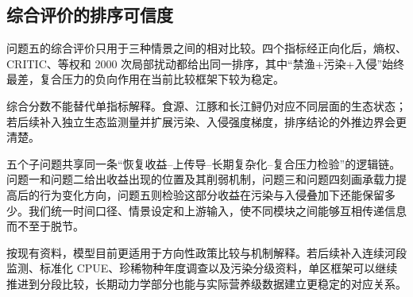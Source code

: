 \subsection{综合评价的排序可信度}
问题五的综合评价只用于三种情景之间的相对比较。四个指标经正向化后，熵权、CRITIC、等权和 2000 次局部扰动都给出同一排序，其中“禁渔+污染+入侵”始终最差，复合压力的负向作用在当前比较框架下较为稳定。

综合分数不能替代单指标解释。食源、江豚和长江鲟仍对应不同层面的生态状态；若后续补入独立生态监测量并扩展污染、入侵强度梯度，排序结论的外推边界会更清楚。

\noindent 五个子问题共享同一条“恢复收益--上传导--长期复杂化--复合压力检验”的逻辑链。问题一和问题二给出收益出现的位置及其削弱机制，问题三和问题四刻画承载力提高后的行为变化方向，问题五则检验这部分收益在污染与入侵叠加下还能保留多少。我们统一时间口径、情景设定和上游输入，使不同模块之间能够互相传递信息而不至于脱节。

\noindent 按现有资料，模型目前更适用于方向性政策比较与机制解释。若后续补入连续河段监测、标准化 CPUE、珍稀物种年度调查以及污染分级资料，单区框架可以继续推进到分段比较，长期动力学部分也能与实际营养级数据建立更稳定的对应关系。

